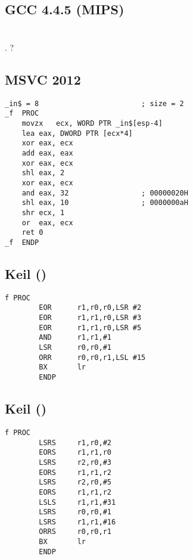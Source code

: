 

\subsection{\Optimizing GCC 4.4.5 (MIPS)}




\section{}

.
?

\subsection{\Optimizing MSVC 2012}

\begin{lstlisting}
_in$ = 8						; size = 2
_f	PROC
	movzx	ecx, WORD PTR _in$[esp-4]
	lea	eax, DWORD PTR [ecx*4]
	xor	eax, ecx
	add	eax, eax
	xor	eax, ecx
	shl	eax, 2
	xor	eax, ecx
	and	eax, 32					; 00000020H
	shl	eax, 10					; 0000000aH
	shr	ecx, 1
	or	eax, ecx
	ret	0
_f	ENDP
\end{lstlisting}

\subsection{Keil (\ARMMode)}

\begin{lstlisting}
f PROC
        EOR      r1,r0,r0,LSR #2
        EOR      r1,r1,r0,LSR #3
        EOR      r1,r1,r0,LSR #5
        AND      r1,r1,#1
        LSR      r0,r0,#1
        ORR      r0,r0,r1,LSL #15
        BX       lr
        ENDP
\end{lstlisting}

\subsection{Keil (\ThumbMode)}

\begin{lstlisting}
f PROC
        LSRS     r1,r0,#2
        EORS     r1,r1,r0
        LSRS     r2,r0,#3
        EORS     r1,r1,r2
        LSRS     r2,r0,#5
        EORS     r1,r1,r2
        LSLS     r1,r1,#31
        LSRS     r0,r0,#1
        LSRS     r1,r1,#16
        ORRS     r0,r0,r1
        BX       lr
        ENDP
\end{lstlisting}

